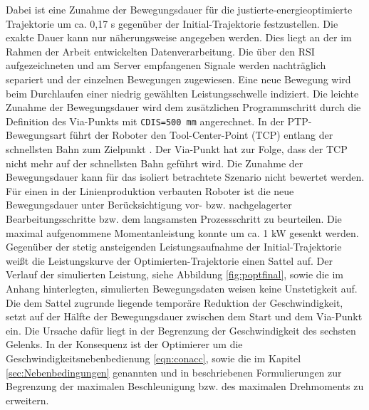 Dabei ist eine Zunahme der Bewegungsdauer für die justierte-energieoptimierte Trajektorie um ca. 0,17 s gegenüber der Initial-Trajektorie festzustellen. Die exakte Dauer kann nur näherungsweise angegeben werden. Dies liegt an der im Rahmen der Arbeit entwickelten Datenverarbeitung. Die über den RSI aufgezeichneten und am Server empfangenen Signale werden nachträglich separiert und der einzelnen Bewegungen zugewiesen. Eine neue Bewegung wird beim Durchlaufen einer niedrig gewählten Leistungsschwelle indiziert. Die leichte Zunahme der Bewegungsdauer wird  dem zusätzlichen Programmschritt durch die Definition des Via-Punkts mit \lstinline|CDIS=500 mm| angerechnet. In der PTP-Bewegungsart führt der Roboter den Tool-Center-Point (TCP) entlang der schnellsten Bahn zum Zielpunkt \cite[S.~429]{KSS.2023}. Der Via-Punkt hat zur Folge, dass der TCP nicht mehr auf der schnellsten Bahn geführt wird. Die Zunahme der Bewegungsdauer kann für das isoliert betrachtete Szenario nicht bewertet werden. Für einen in der Linienproduktion verbauten Roboter ist die neue Bewegungsdauer unter Berücksichtigung vor- bzw. nachgelagerter Bearbeitungsschritte bzw. dem langsamsten Prozessschritt zu beurteilen.  Die maximal aufgenommene Momentanleistung konnte um ca. 1 kW gesenkt werden. 
Gegenüber der stetig ansteigenden Leistungsaufnahme der Initial-Trajektorie weißt die Leistungskurve der Optimierten-Trajektorie einen Sattel auf.  Der Verlauf der simulierten Leistung, siehe Abbildung \ref{fig:poptfinal}, sowie die im Anhang hinterlegten, simulierten Bewegungsdaten weisen keine Unstetigkeit auf. Die dem Sattel zugrunde liegende temporäre Reduktion der Geschwindigkeit, setzt auf der Hälfte der Bewegungsdauer zwischen dem Start und dem Via-Punkt ein. Die Ursache dafür liegt in der Begrenzung der Geschwindigkeit des sechsten Gelenks. In der Konsequenz ist der Optimierer um die Geschwindigkeitsnebenbedienung \ref{eqn:conacc}, sowie die im Kapitel \ref{sec:Nebenbedingungen} genannten und in \cite[S.~5]{Hansen.2012} beschriebenen Formulierungen zur Begrenzung der maximalen Beschleunigung bzw. des maximalen Drehmoments zu erweitern. 
